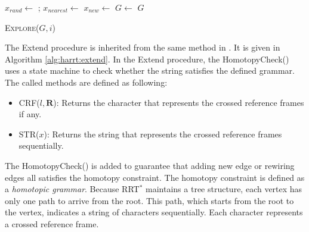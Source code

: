 \documentclass[letterpaper, 10 pt, conference]{ieeeconf}
\begin{document}
\begin{algorithm}[hbtp]
	\begin{algorithmic}[1]
		\State $ x_{rand} \leftarrow $  ;
		\State $ x_{nearest} \leftarrow $ 
		\State $ x_{new} \leftarrow $ 
			\State $ G \leftarrow $ 
		\EndIf
		\Return $ G $
	\end{algorithmic}
	\caption{ \textsc{Explore}($ G, i $) }
	\label{alg:harrt:explore}
\end{algorithm}

The {\sc Extend} procedure is inherited from the same method in \cite{Karaman-RSS-10}.
It is given in Algorithm \ref{alg:harrt:extend}.
In the {\sc Extend} procedure, the {\sc HomotopyCheck}() uses a state machine to check whether the string satisfies the defined grammar.
The called methods are defined as following:
\begin{itemize}
	\item \textsc{CRF}($ l, \bm{R} $):
	Returns the character that represents the crossed reference frames if any.
	\item \textsc{STR}($ x $):	
	Returns the string that represents the crossed reference frames sequentially.
\end{itemize}

The {\sc HomotopyCheck}() is added to guarantee that adding new edge or rewiring edges all satisfies the homotopy constraint.
The homotopy constraint is defined as a \emph{homotopic grammar}.
Because RRT$^{*}$ maintains a tree structure, each vertex has only one path to arrive from the root.
This path, which starts from the root to the vertex, indicates a string of characters sequentially.
Each character represents a crossed reference frame.
\end{document}
